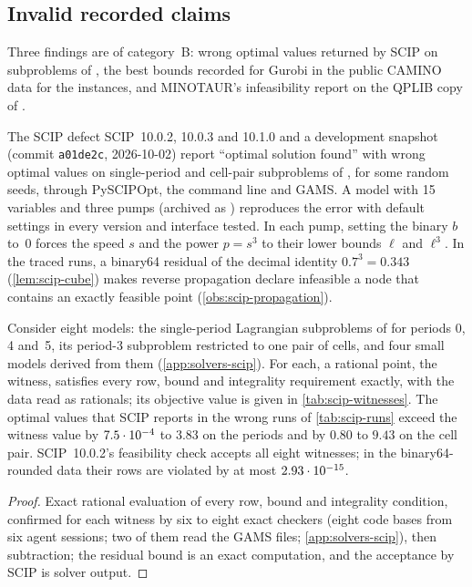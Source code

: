 \subsection{Invalid recorded claims}\label{sec:solvers-invalid}

Three findings are of category~B: wrong optimal values returned by SCIP on subproblems of , the best bounds recorded for Gurobi in the public CAMINO data for the  instances, and MINOTAUR's infeasibility report on the QPLIB copy of .

\begin{infobox}[label={box:scip}]{The SCIP defect}
SCIP~10.0.2, 10.0.3 and 10.1.0 and a development snapshot (commit \texttt{a01de2c}, 2026-10-02) report ``optimal solution found'' with wrong optimal values on single-period and cell-pair subproblems of , for some random seeds, through PySCIPOpt, the command line and GAMS.
A model with 15 variables and three pumps (archived as ) reproduces the error with default settings in every version and interface tested.
In each pump, setting the binary $b$ to~0 forces the speed $s$ and the power $p=s^3$ to their lower bounds $\ell$ and $\ell^3$.
In the traced runs, a binary64 residual of the decimal identity $0.7^3=0.343$ (\cref{lem:scip-cube}) makes reverse propagation declare infeasible a node that contains an exactly feasible point (\cref{obs:scip-propagation}).
\end{infobox}

\begin{proposition}[Witnesses]\label{prop:scip-witnesses}
Consider eight models: the single-period Lagrangian subproblems of  for periods 0, 4 and~5, its period-3 subproblem restricted to one pair of cells, and four small models derived from them (\cref{app:solvers-scip}).
For each, a rational point, the witness, satisfies every row, bound and integrality requirement exactly, with the data read as rationals; its objective value is given in \cref{tab:scip-witnesses}.
The optimal values that SCIP reports in the wrong runs of \cref{tab:scip-runs} exceed the witness value by $7.5\cdot 10^{-4}$ to $3.83$ on the periods and by $0.80$ to $9.43$ on the cell pair.
SCIP~10.0.2's feasibility check accepts all eight witnesses; in the binary64-rounded data their rows are violated by at most $2.93\cdot 10^{-15}$.
\end{proposition}

\begin{proof}
Exact rational evaluation of every row, bound and integrality condition, confirmed for each witness by six to eight exact checkers (eight code bases from six agent sessions; two of them read the GAMS files; \cref{app:solvers-scip}), then subtraction; the residual bound is an exact computation, and the acceptance by SCIP is solver output.
\end{proof}

